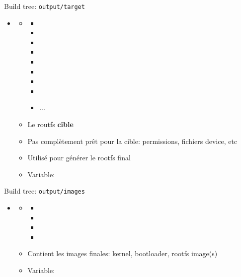 \documentclass[aspectratio=169,obeyspaces,spaces,hyphens,dvipsnames]{beamer}
\begin{document}
\begin{frame}{Build tree: {\tt output/target}}
  \begin{itemize}
  \item {}
    \begin{itemize}
    \item {}
      \begin{itemize}
        \tiny
      \item {}
      \item {}
      \item {}
      \item {}
      \item {}
      \item {}
      \item {}
      \item {}
      \item ...
      \end{itemize}
    \item Le routfs \textbf{cible}
    \item Pas complètement prêt pour la cible: permissions, fichiers device, etc
    \item Utilisé pour générer le rootfs final 
    \item Variable: 
    \end{itemize}
  \end{itemize}
\end{frame}

\begin{frame}{Build tree: {\tt output/images}}
  \begin{itemize}
  \item {}
    \begin{itemize}
    \item {}
      \begin{itemize}
        \scriptsize
      \item {}
      \item {}
      \item {}
      \item {}
      \end{itemize}
    \item Contient les images finales: kernel, bootloader, rootfs image(s)
    \item Variable: 
    \end{itemize}
  \end{itemize}
\end{frame}
\end{document}
